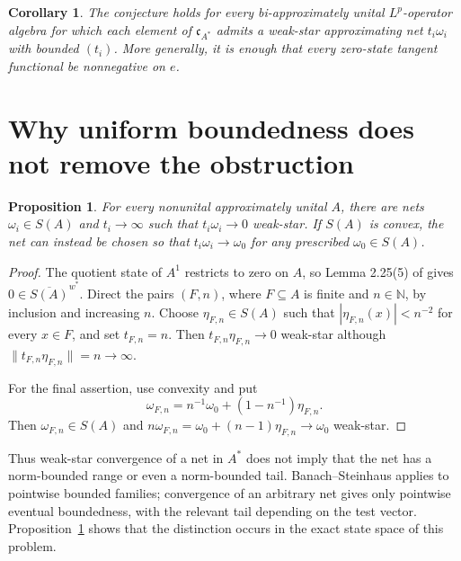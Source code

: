 \documentclass[11pt]{article}
\newtheorem{proposition}{Proposition}
\newtheorem{corollary}{Corollary}
\newcommand{\cA}{\mathfrak c_{A^*}}
\begin{document}
\begin{corollary}
The conjecture holds for every bi-approximately unital $L^p$-operator algebra
for which each element of $\cA$ admits a weak-star approximating net
$t_i\omega_i$ with bounded $(t_i)$.  More generally, it is enough that every
zero-state tangent functional be nonnegative on $e$.
\end{corollary}

\section*{Why uniform boundedness does not remove the obstruction}
\begin{proposition}\label{prop:escape}
For every nonunital approximately unital $A$, there are nets
$\omega_i\in S(A)$ and $t_i\to\infty$ such that $t_i\omega_i\to0$ weak-star.
If $S(A)$ is convex, the net can instead be chosen so that
$t_i\omega_i\to\omega_0$ for any prescribed $\omega_0\in S(A)$.
\end{proposition}

\begin{proof}
The quotient state of $A^1$ restricts to zero on $A$, so Lemma 2.25(5) of
\cite{Source} gives $0\in\overline{S(A)}^{w^*}$.  Direct the pairs $(F,n)$,
where $F\subseteq A$ is finite and $n\in\mathbb N$, by inclusion and increasing
$n$.  Choose $\eta_{F,n}\in S(A)$ such that
$|\eta_{F,n}(x)|<n^{-2}$ for every $x\in F$, and set $t_{F,n}=n$.
Then $t_{F,n}\eta_{F,n}\to0$ weak-star although
$\|t_{F,n}\eta_{F,n}\|=n\to\infty$.

For the final assertion, use convexity and put
\[
 \omega_{F,n}=n^{-1}\omega_0+(1-n^{-1})\eta_{F,n}.
\]
Then $\omega_{F,n}\in S(A)$ and
$n\omega_{F,n}=\omega_0+(n-1)\eta_{F,n}\to\omega_0$ weak-star.
\end{proof}

Thus weak-star convergence of a net in $A^*$ does not imply that the net has
a norm-bounded range or even a norm-bounded tail.  Banach--Steinhaus applies
to pointwise bounded families; convergence of an arbitrary net gives only
pointwise eventual boundedness, with the relevant tail depending on the test
vector.  Proposition~\ref{prop:escape} shows that the distinction occurs in
the exact state space of this problem.
\end{document}
